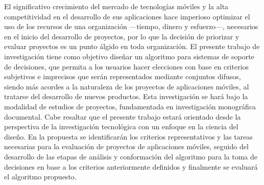 El significativo crecimiento del mercado de tecnologías móviles y la alta competitividad en el desarrollo de sus aplicaciones hace imperioso optimizar el uso de los recursos de una organización ---tiempo, dinero y esfuerzo---, necesarios en el inicio del desarrollo de proyectos, por lo que la decisión de priorizar y evaluar proyectos es un punto álgido en toda organización. El presente trabajo de investigación tiene como objetivo diseñar un algoritmo para sistemas de soporte de decisiones, que permita a los usuarios hacer elecciones con base en criterios subjetivos e imprecisos que serán representados mediante conjuntos difusos,  siendo más acordes a la naturaleza de los proyectos de aplicaciones móviles, al tratarse del desarrollo de nuevos productos. Esta investigación se hará bajo la modalidad de estudios de proyectos, fundamentada en investigación monográfica documental. Cabe resaltar que el presente trabajo estará orientado desde la perspectiva de la investigación tecnológica con un enfoque en la ciencia del diseño. En la propuesta se identificarán los criterios representativos y las tareas necesarias para la evaluación de proyectos de aplicaciones móviles, seguido del desarrollo de las etapas de análisis y conformación del algoritmo para la toma de decisiones en base a los criterios anteriormente definidos y finalmente se evaluará el algoritmo propuesto.